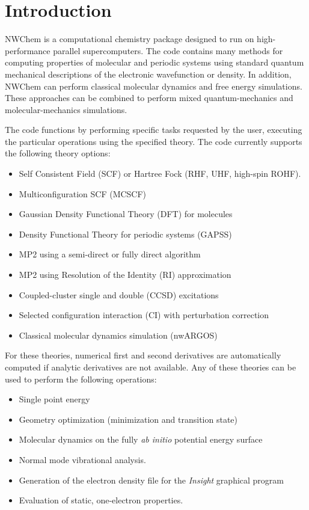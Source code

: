 \label{sec:intro}

\section{Introduction}

NWChem is a computational chemistry package designed to run on high-performance 
parallel supercomputers.  The code contains many methods for computing properties
of molecular and periodic systems using standard quantum mechanical descriptions
of the electronic wavefunction or density.  In addition, NWChem can perform
classical molecular dynamics and free energy simulations.  These approaches can
be combined to perform mixed quantum-mechanics and molecular-mechanics simulations.
 
The code functions by performing specific tasks requested by the user, executing
the particular operations using the specified theory.  The code currently supports
the following theory options:


\begin{itemize}
 \item Self Consistent Field (SCF) or Hartree Fock (RHF, UHF, high-spin
  ROHF).  
 \item Multiconfiguration SCF (MCSCF)
 \item Gaussian Density Functional Theory (DFT) for molecules
 \item Density Functional Theory for periodic systems (GAPSS)
 \item MP2 using a semi-direct or fully direct algorithm
 \item MP2 using Resolution of the Identity (RI) approximation
 \item Coupled-cluster single and double (CCSD) excitations
 \item Selected configuration interaction (CI) with perturbation
   correction 
 \item Classical molecular dynamics simulation (nwARGOS)
\end{itemize}

For these theories, numerical first and second derivatives are 
automatically computed if
analytic derivatives are not available.
Any of these theories can be used to perform the following operations:

\begin{itemize}
\item Single point energy
\item Geometry optimization (minimization and transition state)
\item Molecular dynamics on the fully {\em ab initio} potential energy
  surface
\item Normal mode vibrational analysis.
\item Generation of the electron density file for the {\em Insight}
      graphical program
\item Evaluation of static, one-electron properties.
\end{itemize}

